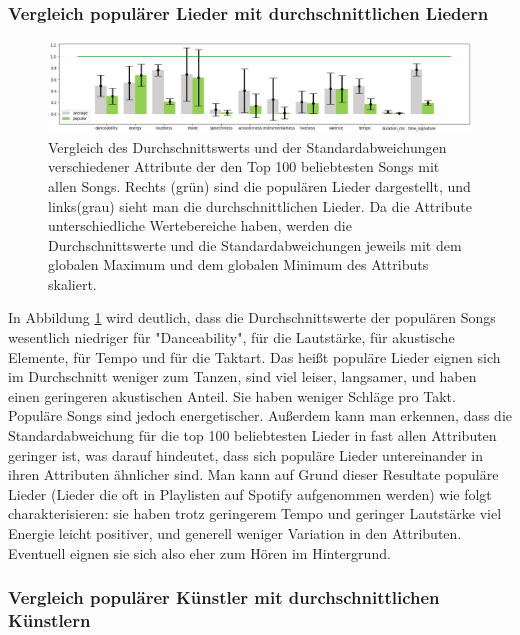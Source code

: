 \documentclass[conference]{IEEEtran}
\begin{document}
\subsubsection{Vergleich populärer Lieder mit durchschnittlichen Liedern}

\begin{figure}[t]
\centering
\includegraphics[width=\textwidth]{images/pop_tracks.png}
\caption{Vergleich des Durchschnittswerts und der Standardabweichungen verschiedener Attribute der den Top 100 beliebtesten Songs mit allen Songs. Rechts (grün) sind die populären Lieder dargestellt, und links(grau) sieht man die durchschnittlichen Lieder. Da die Attribute unterschiedliche Wertebereiche haben, werden die Durchschnittswerte und die Standardabweichungen jeweils mit dem globalen Maximum und dem globalen Minimum des Attributs skaliert.}
\label{popular tracks}
\end{figure}

In Abbildung \ref{popular tracks} wird deutlich, dass die Durchschnittswerte der populären Songs wesentlich niedriger für "Danceability", für die Lautstärke, für akustische Elemente, für Tempo und für die Taktart. Das heißt populäre Lieder eignen sich im Durchschnitt weniger zum Tanzen, sind viel leiser, langsamer, und haben einen geringeren akustischen Anteil. Sie haben weniger Schläge pro Takt. Populäre Songs sind jedoch energetischer.
Außerdem kann man erkennen, dass die Standardabweichung für die top 100 beliebtesten Lieder in fast allen Attributen geringer ist, was darauf hindeutet, dass sich populäre Lieder untereinander in ihren Attributen ähnlicher sind.
Man kann auf Grund dieser Resultate populäre Lieder (Lieder die oft in Playlisten auf Spotify aufgenommen werden) wie folgt charakterisieren: sie haben trotz geringerem Tempo und geringer Lautstärke viel Energie leicht positiver, und generell weniger Variation in den Attributen. Eventuell eignen sie sich also eher zum Hören im Hintergrund. 

\subsubsection{Vergleich populärer Künstler mit durchschnittlichen Künstlern}
\end{document}
